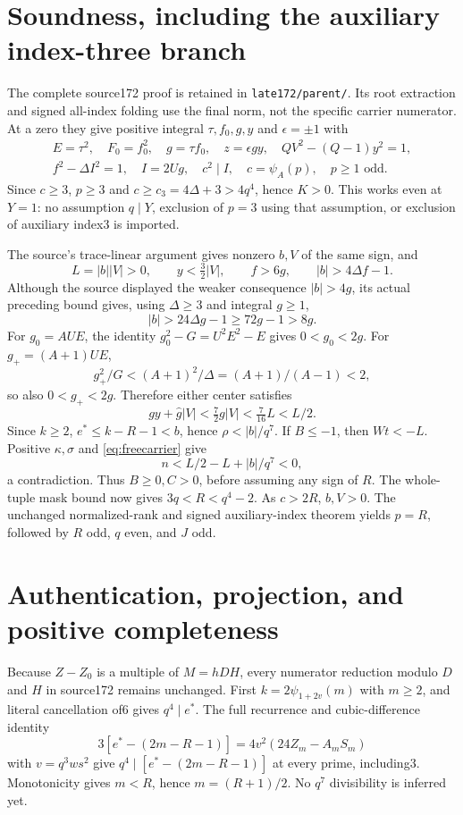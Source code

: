 \section{Soundness, including the auxiliary index-three branch}
The complete source172 proof is retained in \texttt{late172/parent/}.
Its root extraction and signed all-index folding use the final norm,
not the specific carrier numerator. At a zero they give positive integral
$\tau,f_0,g,y$ and $\epsilon=\pm1$ with
\begin{gather*}
 E=\tau^2,\quad F_0=f_0^2,\quad g=\tau f_0,\quad z=\epsilon gy,
 \quad QV^2-(Q-1)y^2=1,\\
 f^2-\Delta I^2=1,\quad I=2Ug,\quad c^2\mid I,
 \quad c=\psi_A(p),\quad p\ge1\text{ odd}.
\end{gather*}
Since $c\ge3$, $p\ge3$ and $c\ge c_3=4\Delta+3>4q^4$, hence $K>0$.
This works even at $Y=1$: no assumption $q\mid Y$, exclusion of $p=3$
using that assumption, or exclusion of auxiliary index3 is imported.

The source's trace-linear argument gives nonzero $b,V$ of the same sign,
and
\[
 L=|b||V|>0,\qquad y<\tfrac32|V|,\qquad f>6g,
 \qquad |b|>4\Delta f-1.
\]
Although the source displayed the weaker consequence $|b|>4g$, its actual
preceding bound gives, using $\Delta\ge3$ and integral $g\ge1$,
\begin{equation}
 |b|>24\Delta g-1\ge72g-1>8g.\label{eq:strongmargin}
\end{equation}
For $g_0=AUE$, the identity $g_0^2-G=U^2E^2-E$ gives $0<g_0<2g$.
For $g_+=(A+1)UE$,
\[
 g_+^2/G<(A+1)^2/\Delta=(A+1)/(A-1)<2,
\]
so also $0<g_+<2g$. Therefore either center satisfies
\begin{equation}
 gy+\widehat g|V|<\tfrac72g|V|<\tfrac7{16}L<L/2.\label{eq:freemargin}
\end{equation}
Since $k\ge2$, $e^*\le k-R-1<b$, hence $\rho<|b|/q^7$.
If $B\le-1$, then $Wt<-L$. Positive $\kappa,\sigma$ and
\eqref{eq:freecarrier} give
\[
 n<L/2-L+|b|/q^7<0,
\]
a contradiction. Thus $B\ge0,C>0$, before assuming any sign of $R$.
The whole-tuple mask bound now gives $3q<R<q^4-2$. As $c>2R$, $b,V>0$.
The unchanged normalized-rank and signed auxiliary-index theorem yields
$p=R$, followed by $R$ odd, $q$ even, and $J$ odd.

\section{Authentication, projection, and positive completeness}
Because $Z-Z_0$ is a multiple of $M=hDH$, every numerator reduction modulo
$D$ and $H$ in source172 remains unchanged. First
$k=2\psi_{1+2v}(m)$ with $m\ge2$, and literal cancellation of6 gives
$q^4\mid e^*$. The full recurrence and cubic-difference identity
\[
 3[e^*-(2m-R-1)]=4v^2(24Z_m-A_mS_m)
\]
with $v=q^3ws^2$ give $q^4\mid[e^*-(2m-R-1)]$ at every prime,
including3. Monotonicity gives $m<R$, hence $m=(R+1)/2$.
No $q^7$ divisibility is inferred yet.

